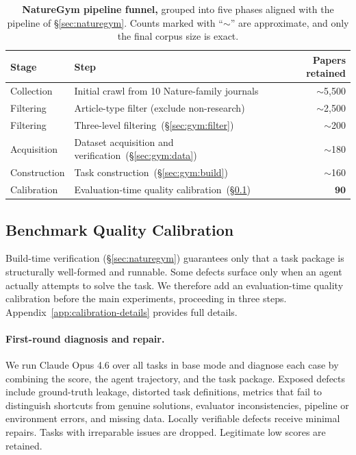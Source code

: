 \begin{table}[!ht]
\centering
\caption{\textbf{NatureGym pipeline funnel,} grouped into five phases aligned with the pipeline of \S\ref{sec:naturegym}. Counts marked with ``$\sim$'' are approximate, and only the final corpus size is exact.}
\label{tab:funnel}
\small
\begin{tabular}{llr}
\toprule
\textbf{Stage} & \textbf{Step} & \textbf{Papers retained} \\
\midrule
Collection    & Initial crawl from 10 Nature-family journals                 & $\sim$5{,}500 \\
Filtering     & Article-type filter (exclude non-research)                   & $\sim$2{,}500 \\
Filtering     & Three-level filtering~(\S\ref{sec:gym:filter})               & $\sim$200     \\
Acquisition   & Dataset acquisition and verification~(\S\ref{sec:gym:data})    & $\sim$180     \\
Construction  & Task construction~(\S\ref{sec:gym:build})     & $\sim$160     \\
Calibration   & Evaluation-time quality calibration~(\S\ref{sec:nb:calib})   & $\mathbf{90}$ \\
\bottomrule
\end{tabular}
\end{table}

\subsection{Benchmark Quality Calibration}
\label{sec:nb:calib}


Build-time verification (\S\ref{sec:naturegym}) guarantees only that a task package is structurally well-formed and runnable. Some defects surface only when an agent actually attempts to solve the task.
We therefore add an evaluation-time quality calibration before the main experiments, proceeding in three steps. Appendix~\ref{app:calibration-details} provides full details.

\paragraph{First-round diagnosis and repair.} We run Claude Opus 4.6 over all tasks in base mode and diagnose each case by combining the score, the agent trajectory, and the task package. Exposed defects include ground-truth leakage, distorted task definitions, metrics that fail to distinguish shortcuts from genuine solutions, evaluator inconsistencies, pipeline or environment errors, and missing data. Locally verifiable defects receive minimal repairs. Tasks with irreparable issues are dropped. Legitimate low scores are retained.

